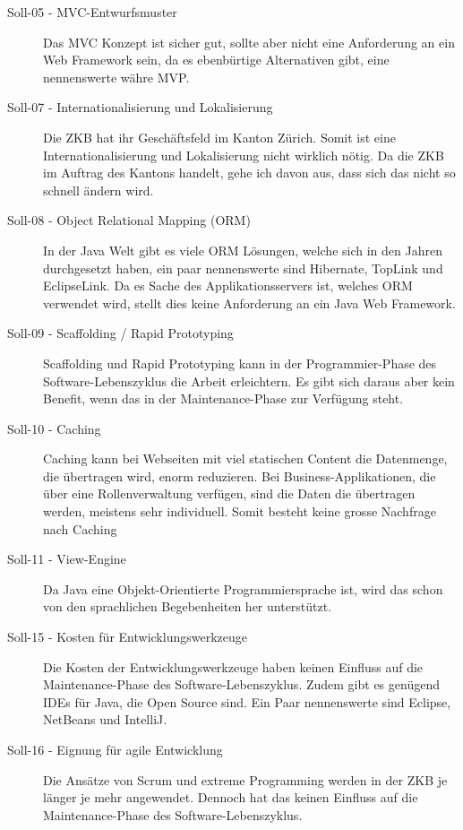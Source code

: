   \begin{description}
  \item[Soll-05 - MVC-Entwurfsmuster]
  Das \ac{MVC} Konzept ist sicher gut, sollte aber nicht eine Anforderung an ein
  Web Framework sein, da es ebenbürtige Alternativen gibt, eine nennenswerte
  währe \ac{MVP}.
  
  \item[Soll-07 - Internationalisierung und Lokalisierung]
  Die \ac{ZKB} hat ihr Geschäftsfeld im Kanton Zürich. Somit ist eine
  Internationalisierung und Lokalisierung nicht wirklich nötig. Da die \ac{ZKB}
  im Auftrag des Kantons handelt, gehe ich davon aus, dass sich das nicht so
  schnell ändern wird.
  
  \item[Soll-08 - Object Relational Mapping (ORM)]
  In der Java Welt gibt es viele \ac{ORM} Lösungen, welche sich in den Jahren
  durchgesetzt haben, ein paar nennenswerte sind Hibernate, TopLink und
  EclipseLink. Da es Sache des Applikationsservers ist, welches \ac{ORM}
  verwendet wird, stellt dies keine Anforderung an ein Java Web Framework.
  
  \item[Soll-09 - Scaffolding / Rapid Prototyping]
  Scaffolding und Rapid Prototyping kann in der Programmier-Phase des
  Software-Lebenszyklus die Arbeit erleichtern. Es gibt sich daraus aber kein
  Benefit, wenn das in der Maintenance-Phase zur Verfügung steht.
  
  \item[Soll-10 - Caching]
  Caching kann bei Webseiten mit viel statischen Content die Datenmenge, die
  übertragen wird, enorm reduzieren. Bei Business-Applikationen, die über eine
  Rollenverwaltung verfügen, sind die Daten die übertragen werden, meistens sehr
  individuell. Somit besteht keine grosse Nachfrage nach Caching
  
  \item[Soll-11 - View-Engine]
  Da Java eine Objekt-Orientierte Programmiersprache ist, wird das schon von den
  sprachlichen Begebenheiten her unterstützt.
  
  \item[Soll-15 - Kosten für Entwicklungswerkzeuge]
  Die Kosten der Entwicklungswerkzeuge haben keinen Einfluss auf die
  Maintenance-Phase des Software-Lebenszyklus. Zudem gibt es genügend \acp{IDE}
  für Java, die Open Source sind. Ein Paar nennenswerte sind Eclipse, NetBeans
  und IntelliJ.
  
  \item[Soll-16 - Eignung für agile Entwicklung]
  Die Ansätze von Scrum und extreme Programming werden in der \ac{ZKB} je länger
  je mehr angewendet. Dennoch hat das keinen Einfluss auf die Maintenance-Phase
  des Software-Lebenszyklus.
  \end{description}